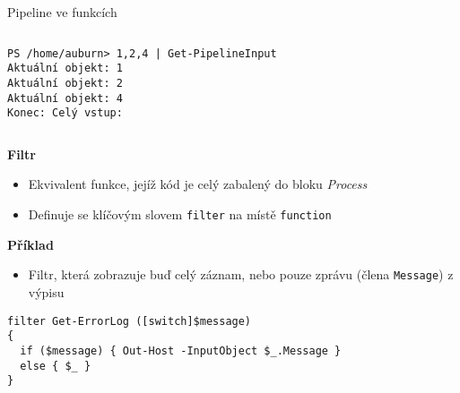 \documentclass[main.tex]{subfiles}
\begin{document}
\begin{frame}{Pipeline ve funkcích}
\begin{columns}[t]
\begin{column}{0.53\textwidth}
\begin{verbatim}
PS /home/auburn> 1,2,4 | Get-PipelineInput
Aktuální objekt: 1
Aktuální objekt: 2
Aktuální objekt: 4
Konec: Celý vstup:
\end{verbatim}
  \end{column}
\end{columns}
\framebreak
\textbf{Filtr}
\begin{itemize}
  \item Ekvivalent funkce, jejíž kód je celý zabalený do bloku \textit{Process}
  \item Definuje se klíčovým slovem \texttt{filter} na místě \texttt{function}
\end{itemize}
\textbf{Příklad}
\begin{itemize}
  \item Filtr, která zobrazuje buď celý záznam, nebo pouze zprávu (člena \texttt{Message}) z výpisu
\end{itemize}
\begin{verbatim}
filter Get-ErrorLog ([switch]$message)
{
  if ($message) { Out-Host -InputObject $_.Message }
  else { $_ }
}
\end{verbatim}
\end{frame}
\end{document}
